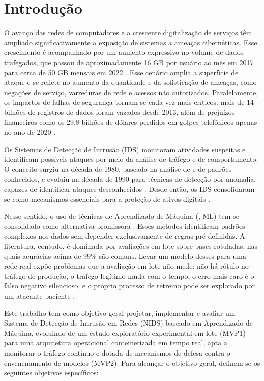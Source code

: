 \section{Introdução}

O avanço das redes de computadores e a crescente digitalização de serviços têm
ampliado significativamente a exposição de sistemas a ameaças cibernéticas. Esse
crescimento é acompanhado por um aumento expressivo no volume de dados trafegados,
que passou de aproximadamente 16 GB por usuário ao mês em 2017 para cerca de 50 GB
mensais em 2022 \cite{Thakkar2021Survey}. Esse cenário amplia a superfície de
ataque e se reflete no aumento da quantidade e da sofisticação de ameaças, como
negações de serviço, varreduras de rede e acessos não autorizados. Paralelamente, os
impactos de falhas de segurança tornam-se cada vez mais críticos: mais de
14 bilhões de registros de dados foram vazados desde 2013, além de prejuízos
financeiros como os 29,8 bilhões de dólares perdidos em golpes
telefônicos apenas no ano de 2020 \cite{zehedi2023comparative}.

Os Sistemas de Detecção de Intrusão (IDS) monitoram atividades suspeitas e
identificam possíveis ataques por meio da análise de tráfego e de comportamento.
O conceito surgiu na década de 1980, baseado na análise de  e de padrões
conhecidos, e evoluiu na década de 1990 para técnicas de detecção por anomalia,
capazes de identificar ataques desconhecidos \cite{patrick2022study}. Desde então,
os IDS consolidaram-se como mecanismos essenciais para a proteção de ativos
digitais \cite{emad2022intrusion}.

Nesse sentido, o uso de técnicas de Aprendizado de Máquina (,
ML) tem se consolidado como alternativa promissora \cite{Khraisat2019Survey}.
Esses métodos identificam padrões complexos nos dados sem depender exclusivamente
de regras pré-definidas. A literatura, contudo, é dominada por avaliações em lote
sobre bases rotuladas, nas quais acurácias acima de 99\% são comuns. Levar um
modelo desses para uma rede real expõe problemas que a avaliação em lote não
mede: não há rótulo no tráfego de produção, o tráfego legítimo muda com o tempo,
o erro mais caro é o falso negativo silencioso, e o próprio processo de retreino
pode ser explorado por um atacante paciente \cite{Sommer2010Outside, Biggio2012Poisoning}.

Este trabalho tem como objetivo geral projetar, implementar e avaliar um Sistema de
Detecção de Intrusão em Redes (NIDS) baseado em Aprendizado de Máquina, evoluindo
de um estudo exploratório experimental em lote (MVP1) para uma arquitetura
operacional conteinerizada em tempo real, apta a monitorar o tráfego contínuo e
dotada de mecanismos de defesa contra o envenenamento de modelos (MVP2). Para
alcançar o objetivo geral, definem-se os seguintes objetivos específicos:

